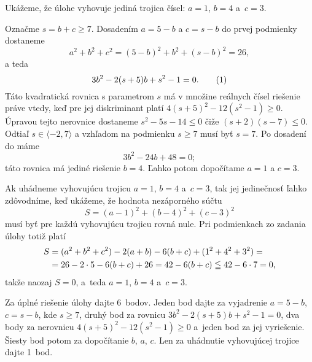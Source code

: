 {%
Ukážeme, že úlohe vyhovuje jediná trojica čísel: $a=1$, $b=4$ a~$c=3$.

Označme $s=b+c\ge7$. Dosadením $a=5-b$ a $c=s-b$ do prvej podmienky dostaneme
$$
a^2+b^2+c^2=(5-b)^2+b^2+(s-b)^2=26,
$$
a teda
$$
3b^2-2(s+5)b+s^2-1=0.
\tag1
$$
Táto kvadratická rovnica s parametrom $s$ má v množine reálnych čísel riešenie práve vtedy, keď pre jej diskriminant platí
$4(s+5)^2-12(s^2-1)\ge0$. Úpravou tejto nerovnice dostaneme $s^2-5s-14\le0$ čiže $(s+2)(s-7)\le0$.
Odtiaľ $s\in\langle-2,7\rangle$ a vzhľadom na podmienku $s\ge7$ musí byť $s=7$. Po dosadení do  máme
$$
3b^2-24b+48=0;
$$
táto rovnica má jediné riešenie $b=4$. Ľahko potom dopočítame $a=1$ a $c=3$.

\ineriesenie
Ak uhádneme vyhovujúcu trojicu $a=1$, $b=4$
a~$c=3$, tak jej jedinečnosť ľahko zdôvodníme, keď ukážeme, že
hodnota nezáporného súčtu
$$
S=(a-1)^2+(b-4)^2+(c-3)^2
$$
musí byť pre každú vyhovujúcu trojicu rovná nule. Pri podmienkach zo
zadania úlohy totiž platí
$$
\aligned
S&=(a^2+b^2+c^2)-2(a+b)-6(b+c)+(1^2+4^2+3^2)=\\
 &=26-2\cdot5-6(b+c)+26=42-6(b+c)\leqq 42- 6\cdot7=0,
\endaligned
$$
takže naozaj $S=0$, a~teda $a=1$, $b=4$ a~$c=3$.


\nobreak\medskip\petit\noindent
Za úplné riešenie úlohy dajte 6~bodov.
Jeden bod dajte za vyjadrenie $a=5-b$, $c=s-b$, kde $s\ge7$, druhý bod za rovnicu $3b^2-2(s+5)b+s^2-1=0$, dva body za nerovnicu $4(s+5)^2-12(s^2-1)\ge0$ a~jeden bod za jej vyriešenie. Šiesty bod potom za dopočítanie $b$, $a$, $c$. Len za uhádnutie vyhovujúcej trojice dajte 1~bod.
\endpetit
\bigbreak
}

